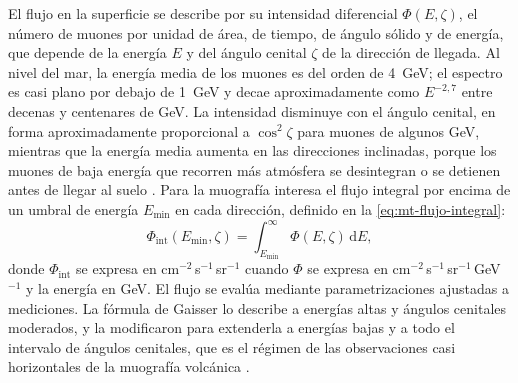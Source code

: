El flujo en la superficie se describe por su intensidad diferencial $\Phi(E,\zeta)$, el número de muones por unidad de área, de tiempo, de ángulo sólido y de energía, que depende de la energía $E$ y del ángulo cenital $\zeta$ de la dirección de llegada. Al nivel del mar, la energía media de los muones es del orden de 4~GeV; el espectro es casi plano por debajo de 1~GeV y decae aproximadamente como $E^{-2{,}7}$ entre decenas y centenares de GeV. La intensidad disminuye con el ángulo cenital, en forma aproximadamente proporcional a $\cos^{2}\zeta$ para muones de algunos GeV, mientras que la energía media aumenta en las direcciones inclinadas, porque los muones de baja energía que recorren más atmósfera se desintegran o se detienen antes de llegar al suelo \parencite{pdg2022}. Para la muografía interesa el flujo integral por encima de un umbral de energía $E_{\min}$ en cada dirección, definido en la \cref{eq:mt-flujo-integral}:
\begin{equation}\label{eq:mt-flujo-integral}
\Phi_{\mathrm{int}}(E_{\min},\zeta)=\int_{E_{\min}}^{\infty}\Phi(E,\zeta)\,\mathrm dE,
\end{equation}
donde $\Phi_{\mathrm{int}}$ se expresa en cm$^{-2}$\,s$^{-1}$\,sr$^{-1}$ cuando $\Phi$ se expresa en cm$^{-2}$\,s$^{-1}$\,sr$^{-1}$\,GeV$^{-1}$ y la energía en GeV. El flujo se evalúa mediante parametrizaciones ajustadas a mediciones. La fórmula de Gaisser lo describe a energías altas y ángulos cenitales moderados, y \textcite{guan2015muonflux} la modificaron para extenderla a energías bajas y a todo el intervalo de ángulos cenitales, que es el régimen de las observaciones casi horizontales de la muografía volcánica \parencite{gaisser2016}.

